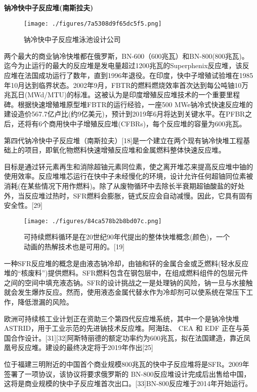 \textbf{钠冷快中子反应堆(南斯拉夫)}

\begin{figure}[ht]
\centering
\texttt{[image: ./figures/7a5308d9f65dc5f5.png]}
\caption{钠冷快中子反应堆泳池设计公司} \label{fig_FYD_7}
\end{figure}

两个最大的商业钠冷快堆都在俄罗斯，BN-600（600兆瓦）和BN-800(800兆瓦)。迄今为止运行的最大的反应堆是发电量超过1200兆瓦的Superphenix反应堆，该反应堆在法国成功运行了数年，直到1996年退役。在印度，快中子增殖试验堆在1985年10月达到临界状态。2002年9月，FBTR的燃料燃烧效率首次达到每公吨铀10万兆瓦日(MWd/MTU)的标准。这被认为是印度增殖反应堆技术的一个重要里程碑。根据快速增殖堆原型堆FBTR的运行经验，一座500 MWe钠冷式快速反应堆的建设造价567.7亿卢比(约9亿美元)，预计到2019年6月将达到关键水平。在PFBR之后，还将有6个商用快中子增殖反应堆(CFBRs)，每个反应堆的容量为600兆瓦。

第四代钠冷快中子反应堆（南斯拉夫）[18]是一个建立在两个现有钠冷快堆工程基础上的项目，即氧化物燃料快速增殖反应堆和金属燃料整体快速反应堆。

目标是通过钚元素再生和消除超铀元素同位素，使之离开堆芯来提高反应堆中铀的使用效率。反应堆堆芯运行在快中子未经慢化的环境，设计允许任何超铀同位素被消耗(在某些情况下用作燃料)。除了从废物循环中去除长半衰期超铀酸盐的好处外，当反应堆过热时，SFR燃料会膨胀，链式反应会自动减慢。因此，它具有固有安全性。[29]

\begin{figure}[ht]
\centering
\texttt{[image: ./figures/84ca578b2b8bd07c.png]}
\caption{可持续燃料循环是在20世纪90年代提出的整体快堆概念(颜色)，一个动画的热解技术也是可用的。[19]} \label{fig_FYD_5}
\end{figure}
一种SFR反应堆的概念是由液态钠冷却，由铀和钚的金属合金或乏燃料(轻水反应堆的“核废料”)提供燃料。SFR燃料包含在钢包层中，在组成燃料组件的包层元件之间的空间中填充液态钠。SFR的设计挑战之一是处理钠的风险，钠一旦与水接触就会发生爆炸反应。然而，使用液态金属代替水作为冷却剂可以使系统在常压下工作，降低泄漏的风险。

欧洲可持续核工业计划正在资助三个第四代反应堆系统，其中一个是钠冷快堆ASTRID，用于工业示范的先进钠技术反应堆。阿海珐、 CEA 和 EDF 正在与英国合作设计。[31][32]阿斯特丽德的额定功率约为600兆瓦，拟在法国建造，靠近凤凰号反应堆。建设的最终决定将于2019年作出[25]

位于福建三明附近的中国首个商业规模800兆瓦的快中子反应堆将是SFR。2009年签署了一项协议，该协议将要求俄罗斯的 BN-800反应堆设计完成后出售给中国，这将是商业规模的快中子反应堆首次出口。[33]BN-800反应堆于2014年开始运行。

